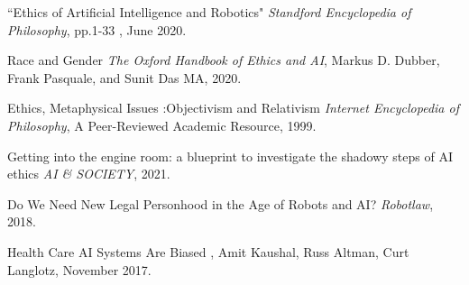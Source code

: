 \documentclass[a4paper,12pt,oneside]{report}
\begin{document}
\cleardoublepage
{}
{}

%
%

\begin{thebibliography}{100} %

 ``Ethics of Artificial Intelligence and Robotics" \emph{Standford Encyclopedia of Philosophy}, pp.1-33 , June 2020.

 Race and Gender \emph{The Oxford Handbook of Ethics and AI}, Markus D. Dubber, Frank Pasquale, and Sunit Das
MA, 2020.

 Ethics, Metaphysical Issues :Objectivism and Relativism \emph{Internet Encyclopedia of Philosophy}, A Peer-Reviewed Academic Resource, 1999.

 Getting into the engine room: a blueprint to investigate the shadowy steps of AI ethics \emph{AI \& SOCIETY},  2021.

 Do We Need New Legal Personhood in the Age of Robots and AI? \emph{Robotlaw},  2018.

 Health Care AI Systems Are Biased \emph{},  Amit Kaushal, Russ Altman, Curt Langlotz, November 2017.


\end{thebibliography}
\end{document}
